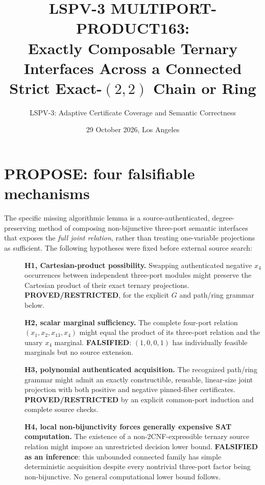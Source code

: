 \documentclass[11pt]{article}
\title{LSPV-3 MULTIPORT-PRODUCT163:\\Exactly Composable Ternary Interfaces Across a Connected Strict Exact-$(2,2)$ Chain or Ring}
\author{LSPV-3: Adaptive Certificate Coverage and Semantic Correctness}
\date{29 October 2026, Los Angeles}
\begin{document}
\maketitle
\begin{center}\end{center}

\section{PROPOSE: four falsifiable mechanisms}
The specific missing algorithmic lemma is a source-authenticated, degree-preserving method of composing non-bijunctive three-port semantic interfaces that exposes the \emph{full joint relation}, rather than treating one-variable projections as sufficient. The following hypotheses were fixed before external source search:
\begin{description}
\item[] \textbf{H1, Cartesian-product possibility.} Swapping authenticated negative $x_4$ occurrences between independent three-port modules might preserve the Cartesian product of their exact ternary projections. \textbf{PROVED/RESTRICTED}, for the explicit $G$ and path/ring grammar below.
\item[] \textbf{H2, scalar marginal sufficiency.} The complete four-port relation $(x_1,x_2,x_{13},x_4)$ might equal the product of its three-port relation and the unary $x_4$ marginal. \textbf{FALSIFIED}: $(1,0,0,1)$ has individually feasible marginals but no source extension.
\item[] \textbf{H3, polynomial authenticated acquisition.} The recognized path/ring grammar might admit an exactly constructible, reusable, linear-size joint projection with both positive and negative pinned-fiber certificates. \textbf{PROVED/RESTRICTED} by an explicit common-port induction and complete source checks.
\item[] \textbf{H4, local non-bijunctivity forces generally expensive SAT computation.} The existence of a non-2CNF-expressible ternary source relation might impose an unrestricted decision lower bound. \textbf{FALSIFIED as an inference}: this unbounded connected family has simple deterministic acquisition despite every nontrivial three-port factor being non-bijunctive. No general computational lower bound follows.
\end{description}
\end{document}
